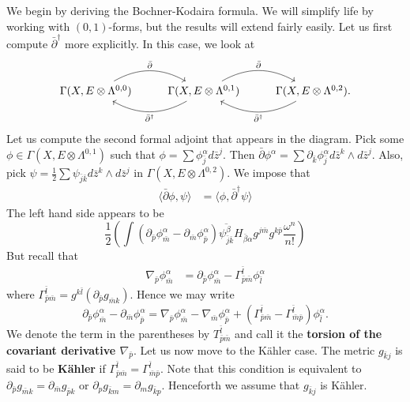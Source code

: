 \documentclass{../mathnotes}
\begin{document}
We begin by deriving the Bochner-Kodaira formula. We will simplify life by working with $(0,1)$-forms, but the results
will extend fairly easily. Let us first compute $\bar\partial^\dagger$ more explicitly. In this case, we look at
\begin{equation*}
    \begin{tikzcd}
        \Gamma(X,E\otimes\Lambda^{0,0})\arrow[bend left]{r}{\bar\partial}&\Gamma(X,E\otimes\Lambda^{0,1})\arrow[bend left]{r}{\bar\partial}\arrow[bend left]{l}{\bar\partial^\dagger} & \Gamma(X,E\otimes\Lambda^{0,2})\arrow[bend left]{l}{\bar\partial^\dagger}.
    \end{tikzcd}
\end{equation*}
Let us compute the second formal adjoint that appears in the diagram. Pick some $\phi\in\Gamma(X,E\otimes\Lambda^{0,1})$ such that $\phi=\sum\phi_{\bar j}^\alpha d\bar z^j$. Then $\bar\partial\phi^\alpha=\sum\partial_{\bar k}\phi_{\bar j}^\alpha d\bar z^k\wedge d\bar z^j$. Also, pick $\psi=\frac{1}{2}\sum\psi_{\bar j\bar k}d\bar z^k\wedge d\bar z^j$ in $\Gamma(X,E\otimes\Lambda^{0,2})$. We impose that
\begin{align*}
    \langle\bar\partial\phi,\psi\rangle&=\langle \phi,\bar\partial^\dagger\psi\rangle
\end{align*}
The left hand side appears to be
\[ \frac{1}{2}\left( \int(\partial_{\bar p}\phi_{\bar m}^\alpha-\partial_{\bar m}\phi^\alpha_{\bar p}) \overline{\psi_{\bar j\bar k}^\beta}H_{\bar \beta\alpha}g^{j\bar m}g^{k\bar p}\frac{\omega^n}{n!} \right)
    \]
But recall that
\begin{align*}
    \nabla_{\bar p}\phi^{\alpha}_{\bar m}&=\partial_{\bar p}\phi_{\bar m}^\alpha-\Gamma^{\bar l}_{\bar p\bar m}\phi_{\bar l}^\alpha
\end{align*}
where $\Gamma_{\bar p\bar m}^{\bar l}=g^{k\bar l}(\partial_{\bar p}g_{\bar mk}).$ Hence we may write
\[\partial_{\bar p}\phi^\alpha_{\bar m}-\partial_{\bar m}\phi_{\bar p}^\alpha=\nabla_{\bar p}\phi^\alpha_{\bar m}-\nabla_{\bar m}\phi_{\bar p}^{\alpha}+(\Gamma^{\bar l}_{\bar p\bar m}-\Gamma^{\bar l}_{\bar m\bar p})\phi_{\bar l}^\alpha.\]
We denote the term in the parentheses by $T^{\bar l}_{\bar p\bar m}$ and call it the \textbf{torsion of the covariant derivative $\nabla_{\bar p}$}. Let us now move to the K\"ahler case.
The metric $g_{\bar kj}$ is said to be \textbf{K\"ahler} if $\Gamma^{\bar l}_{\bar p\bar m}=\Gamma^{\bar l}_{\bar m\bar p}$. Note that this
condition is equivalent to $\partial_{\bar p}g_{\bar mk}=\partial_{\bar m}g_{\bar pk}$ or $\partial_pg_{\bar km}=\partial_m g_{\bar kp}$.
Henceforth we assume that $g_{\bar kj}$ is K\"ahler.
\end{document}
